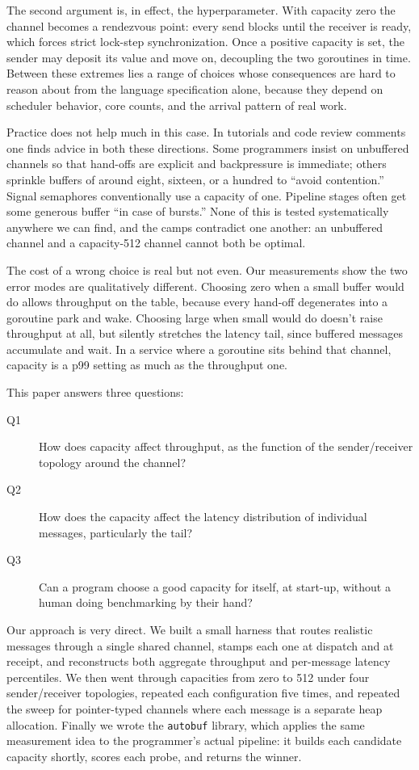\documentclass[10pt,a4paper]{article}
\begin{document}
The second argument is, in effect, the hyperparameter. With capacity zero the
channel becomes a rendezvous point: every send blocks until the receiver is
ready, which forces strict lock-step synchronization. Once a positive capacity
is set, the sender may deposit its value and move on, decoupling the two
goroutines in time. Between these extremes lies a range of choices whose
consequences are hard to reason about from the language specification alone,
because they depend on scheduler behavior, core counts, and the arrival pattern
of real work.

Practice does not help much in this case. In tutorials and code review comments
one finds advice in both these directions. Some programmers insist on
unbuffered channels so that hand-offs are explicit and backpressure is
immediate; others sprinkle buffers of around eight, sixteen, or a hundred to
``avoid contention.'' Signal semaphores conventionally use a capacity of one.
Pipeline stages often get some generous buffer ``in case of bursts.'' None of
this is tested systematically anywhere we can find, and the camps contradict
one another: an unbuffered channel and a capacity-512 channel cannot both be
optimal.

The cost of a wrong choice is real but not even. Our measurements show the two
error modes are qualitatively different. Choosing zero when a small buffer would
do allows throughput on the table, because every hand-off degenerates into a
goroutine park and wake. Choosing large when small would do doesn't raise
throughput at all, but silently stretches the latency tail, since buffered
messages accumulate and wait. In a service where a goroutine sits behind
that channel, capacity is a p99 setting as much as the throughput one.

This paper answers three questions:
\begin{description}
  \item[Q1] How does capacity affect throughput, as the function of the
        sender/receiver topology around the channel?
  \item[Q2] How does the capacity affect the latency distribution of individual
        messages, particularly the tail?
  \item[Q3] Can a program choose a good capacity for itself, at start-up,
        without a human doing benchmarking by their hand?
\end{description}

Our approach is very direct. We built a small harness that routes realistic
messages through a single shared channel, stamps each one at dispatch and at
receipt, and reconstructs both aggregate throughput and per-message latency
percentiles. We then went through capacities from zero to 512 under four
sender/receiver topologies, repeated each configuration five times, and
repeated the sweep for pointer-typed channels where each message is a separate
heap allocation. Finally we wrote the \texttt{autobuf} library, which applies
the same measurement idea to the programmer's actual pipeline: it builds each
candidate capacity shortly, scores each probe, and returns the winner.
\end{document}

